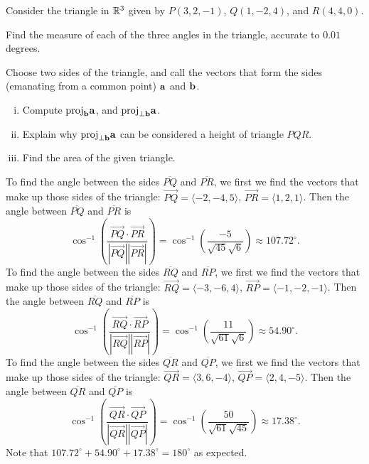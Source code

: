 \begin{exercises}
\begin{exerciseSolution}
\end{exerciseSolution}

\item \label{Ez:9.3.2}  Consider the triangle in $\mathbb{R}^3$ given by $P(3, 2, -1)$, $Q(1, -2, 4)$, and $R(4, 4, 0)$.  

	\ba
		\item Find the measure of each of the three angles in the triangle, accurate to $0.01$ degrees.
		\item Choose two sides of the triangle, and call the vectors that form the sides (emanating from a common point) $\mathbf{a}$ and $\mathbf{b}$.
			\begin{enumerate}[i.]
			\item Compute $\text{proj}_{\mathbf{b}} \mathbf{a}$, and $\text{proj}_{\perp \mathbf{b}} \mathbf{a}$.
			\item Explain why $\text{proj}_{\perp \mathbf{b}} \mathbf{a}$ can be considered a height of triangle $PQR$.
			\item Find the area of the given triangle.   
			\end{enumerate}
	\ea

\begin{exerciseSolution}

    \ba
    \item To find the angle between the sides $\overline{PQ}$ and $\overline{PR}$, we first we find the vectors that make up those sides of the triangle:  $\overrightarrow{PQ} = \langle -2, -4, 5 \rangle$, $\overrightarrow{PR} = \langle 1,2,1 \rangle$. Then the angle between $\overline{PQ}$ and $\overline{PR}$ is 
\[\cos^{-1}\left( \frac{\overrightarrow{PQ} \cdot \overrightarrow{PR}}{|\overrightarrow{PQ}| |\overrightarrow{PR}|} \right) = \cos^{-1}\left( \frac{-5}{\sqrt{45}\sqrt{6}}\right) \approx 107.72^{\circ}.\]
To find the angle between the sides $\overline{RQ}$ and $\overline{RP}$, we first we find the vectors that make up those sides of the triangle:  $\overrightarrow{RQ} = \langle -3, -6, 4 \rangle$, $\overrightarrow{RP} = \langle -1,-2,-1 \rangle$. Then the angle between $\overline{RQ}$ and $\overline{RP}$ is 
\[\cos^{-1}\left( \frac{\overrightarrow{RQ} \cdot \overrightarrow{RP}}{|\overrightarrow{RQ}| |\overrightarrow{RP}|} \right) = \cos^{-1}\left( \frac{11}{\sqrt{61}\sqrt{6}}\right) \approx 54.90^{\circ}.\]
To find the angle between the sides $\overline{QR}$ and $\overline{QP}$, we first we find the vectors that make up those sides of the triangle:  $\overrightarrow{QR} = \langle 3, 6, -4 \rangle$, $\overrightarrow{QP} = \langle 2,4,-5 \rangle$. Then the angle between $\overline{QR}$ and $\overline{QP}$ is 
\[\cos^{-1}\left( \frac{\overrightarrow{QR} \cdot \overrightarrow{QP}}{|\overrightarrow{QR}| |\overrightarrow{QP}|} \right) = \cos^{-1}\left( \frac{50}{\sqrt{61}\sqrt{45}}\right) \approx 17.38^{\circ}.\]
Note that  $107.72^{\circ} + 54.90^{\circ} + 17.38^{\circ} = 180^{\circ}$ as expected. 


\end{exerciseSolution}
\end{exercises}
